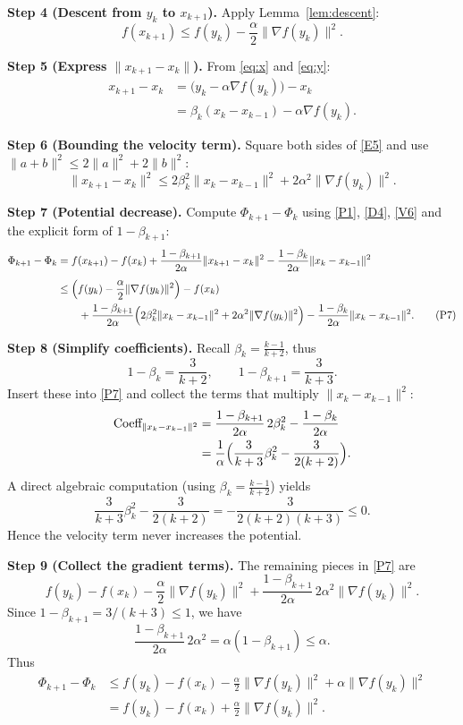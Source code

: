 \documentclass{article}
\begin{document}
\medskip
\noindent\textbf{Step 4 (Descent from $y_k$ to $x_{k+1}$).}  
Apply Lemma~\ref{lem:descent}:
\[
f(x_{k+1})\le f(y_k)-\frac{\alpha}{2}\|\nabla f(y_k)\|^2 . \tag{D4}
\]

\medskip
\noindent\textbf{Step 5 (Express $\|x_{k+1}-x_k\|$).}  
From \eqref{eq:x} and \eqref{eq:y}:
\[
\begin{aligned}
x_{k+1}-x_k
&= \bigl(y_k-\alpha\nabla f(y_k)\bigr)-x_k \\
&= \beta_k (x_k-x_{k-1})-\alpha\nabla f(y_k) . \tag{E5}
\end{aligned}
\]

\medskip
\noindent\textbf{Step 6 (Bounding the velocity term).}  
Square both sides of \eqref{E5} and use $\|a+b\|^2\le 2\|a\|^2+2\|b\|^2$:
\[
\|x_{k+1}-x_k\|^2
\le 2\beta_k^2\|x_k-x_{k-1}\|^2+2\alpha^2\|\nabla f(y_k)\|^2 . \tag{V6}
\]

\medskip
\noindent\textbf{Step 7 (Potential decrease).}  
Compute $\Phi_{k+1}-\Phi_k$ using \eqref{P1}, \eqref{D4}, \eqref{V6} and the explicit form of $1-\beta_{k+1}$:
\[
\begin{aligned}
\Phi_{k+1}-\Phi_k
&= f(x_{k+1})-f(x_k)
   +\frac{1-\beta_{k+1}}{2\alpha}\|x_{k+1}-x_k\|^2
   -\frac{1-\beta_k}{2\alpha}\|x_k-x_{k-1}\|^2 \\[4pt]
&\le \Bigl(f(y_k)-\frac{\alpha}{2}\|\nabla f(y_k)\|^2\Bigr)-f(x_k)   \\
&\qquad +\frac{1-\beta_{k+1}}{2\alpha}
   \Bigl(2\beta_k^2\|x_k-x_{k-1}\|^2+2\alpha^2\|\nabla f(y_k)\|^2\Bigr)
   -\frac{1-\beta_k}{2\alpha}\|x_k-x_{k-1}\|^2 . \tag{P7}
\end{aligned}
\]

\medskip
\noindent\textbf{Step 8 (Simplify coefficients).}  
Recall $\beta_k=\frac{k-1}{k+2}$, thus
\[
1-\beta_k = \frac{3}{k+2},\qquad
1-\beta_{k+1}= \frac{3}{k+3}.
\]
Insert these into \eqref{P7} and collect the terms that multiply $\|x_k-x_{k-1}\|^2$:
\[
\begin{aligned}
\text{Coeff}_{\|x_k-x_{k-1}\|^2}
&= \frac{1-\beta_{k+1}}{2\alpha}\,2\beta_k^2-\frac{1-\beta_k}{2\alpha}  \\
&= \frac{1}{\alpha}\Bigl(\frac{3}{k+3}\beta_k^2-\frac{3}{2(k+2)}\Bigr) .
\end{aligned}
\]
A direct algebraic computation (using $\beta_k=\frac{k-1}{k+2}$) yields
\[
\frac{3}{k+3}\beta_k^2-\frac{3}{2(k+2)}
= -\frac{3}{2(k+2)(k+3)}\le 0 . \tag{C8}
\]
Hence the velocity term never increases the potential.

\medskip
\noindent\textbf{Step 9 (Collect the gradient terms).}  
The remaining pieces in \eqref{P7} are
\[
f(y_k)-f(x_k)
-\frac{\alpha}{2}\|\nabla f(y_k)\|^2
+\frac{1-\beta_{k+1}}{2\alpha}\,2\alpha^2\|\nabla f(y_k)\|^2 .
\]
Since $1-\beta_{k+1}=3/(k+3)\le 1$, we have
\[
\frac{1-\beta_{k+1}}{2\alpha}\,2\alpha^2 = \alpha(1-\beta_{k+1})\le\alpha .
\]
Thus
\[
\begin{aligned}
\Phi_{k+1}-\Phi_k
&\le f(y_k)-f(x_k)
      -\frac{\alpha}{2}\|\nabla f(y_k)\|^2
      +\alpha\|\nabla f(y_k)\|^2  \\
&= f(y_k)-f(x_k)+\frac{\alpha}{2}\|\nabla f(y_k)\|^2 . \tag{G9}
\end{aligned}
\]
\end{document}
